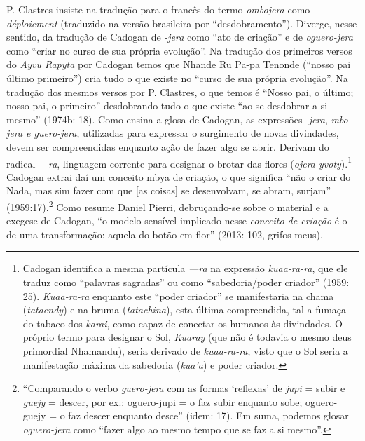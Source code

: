 P. Clastres insiste na tradução para o francês do termo \emph{ombojera}
como \emph{déploiement} (traduzido na versão brasileira por
``desdobramento''). Diverge, nesse sentido, da tradução de Cadogan de
\emph{-jera} como ``ato de criação'' e de \emph{oguero-jera} como
``criar no curso de sua própria evolução''. Na tradução dos primeiros
versos do \emph{Ayvu Rapyta} por Cadogan temos que Nhande Ru Pa-pa
Tenonde (``nosso pai último primeiro'') cria tudo o que existe no
``curso de sua própria evolução''. Na tradução dos mesmos versos por P.
Clastres, o que temos é ``Nosso pai, o último; nosso pai, o primeiro''
desdobrando tudo o que existe ``ao se desdobrar a si mesmo'' (1974b:
18). Como ensina a glosa de Cadogan, as expressões -\emph{jera},
\emph{mbo-jera e guero-jera}, utilizadas para expressar o surgimento de
novas divindades, devem ser compreendidas enquanto ação de fazer algo se
abrir. Derivam do radical ---\emph{ra}, linguagem corrente para designar
o brotar das flores (\emph{ojera yvoty}).\footnote{Cadogan identifica a
  mesma partícula \emph{---ra} na expressão \emph{kuaa-ra-ra}, que ele
  traduz como ``palavras sagradas'' ou como ``sabedoria/poder criador''
  (1959: 25). \emph{Kuaa-ra-ra} enquanto este ``poder criador'' se
  manifestaria na chama (\emph{tataendy}) e na bruma (\emph{tatachina}),
  esta última compreendida, tal a fumaça do tabaco dos \emph{karai},
  como capaz de conectar os humanos às divindades. O próprio termo para
  designar o Sol, \emph{Kuaray} (que não é todavia o mesmo deus
  primordial Nhamandu), seria derivado de \emph{kuaa-ra-ra}, visto que o
  Sol seria a manifestação máxima da sabedoria (\emph{kua'a}) e poder
  criador.} Cadogan extrai daí um conceito mbya de criação, o que
significa ``não o criar do Nada, mas sim fazer com que {[}as coisas{]}
se desenvolvam, se abram, surjam'' (1959:17).\footnote{``Comparando o
  verbo \emph{guero-jera} com as formas `reflexas' de \emph{jupi} =
  subir e \emph{guejy} = descer, por ex.: oguero-jupi = o faz subir
  enquanto sobe; oguero-guejy = o faz descer enquanto desce'' (idem:
  17). Em suma, podemos glosar \emph{oguero-jera} como ``fazer algo ao
  mesmo tempo que se faz a si mesmo''.} Como resume Daniel Pierri,
debruçando-se sobre o material e a exegese de Cadogan, ``o modelo
sensível implicado nesse \emph{conceito de criação} é o de uma
transformação: aquela do botão em flor'' (2013: 102, grifos meus).

